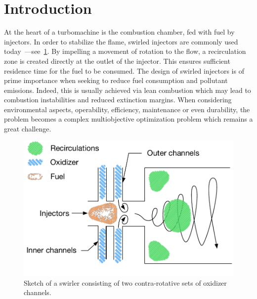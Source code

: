 \newcommand{\pdv}[2]{\frac{\partial{#1}}{\partial{#2}}}
\newcommand{\tilda}[1]{\tilde{#1}}

\section{Introduction}\label{sec:intro}

At the heart of a turbomachine is the combustion chamber, fed with fuel by injectors. In order to stabilize the flame,  swirled injectors are commonly used today~\cite{Lilley1977}---see~\cref{fig:sketch-swirler}. By impelling a movement of rotation to the flow, a recirculation zone is created directly at the outlet of the injector. This ensures sufficient residence time for the fuel to be consumed. The design of swirled injectors is of prime importance when seeking to reduce fuel consumption and pollutant emissions. Indeed, this is usually achieved via lean combustion which may lead to combustion instabilities and reduced extinction margins. When considering environmental aspects, operability, efficiency, maintenance or even durability, the problem becomes a complex multiobjective optimization problem which remains a great challenge.

\begin{figure}[!ht]
\centering
\includegraphics[width=\linewidth,keepaspectratio]{fig/applications/swirler/sketch_swirler.pdf}
\caption{Sketch of a swirler consisting of two contra-rotative sets of oxidizer channels.}
\label{fig:sketch-swirler}
\end{figure}

